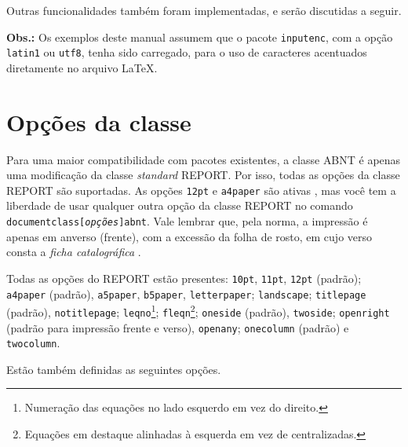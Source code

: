 \documentclass[espaco=simples,appendix=Name]{abnt}
\newcommand{\abnt}{{\smaller ABNT}}%
\newcommand{\report}{{\smaller REPORT}}%
\newcommand{\ac}{\symbol{123}}  %
\newcommand{\fc}{\symbol{125}}  %
\newcommand{\bs}{\symbol{92}}   %
\newcommand{\ingles}[1]{\textsl{#1}}
\begin{document}
Outras funcionalidades também foram implementadas, e serão discutidas a
seguir. 

\textbf{Obs.:} Os exemplos deste manual
assumem que o pacote \texttt{inputenc}, com a opção \texttt{latin1} ou \texttt{utf8}, tenha
sido carregado, para o uso de caracteres acentuados diretamente no arquivo \LaTeX.

\chapter{Opções da classe}\label{sec: opcoes de classe}

Para uma maior compatibilidade com pacotes existentes, a classe \abnt{} é
apenas uma modificação da classe \ingles{standard} \report. Por isso, todas
as opções da classe \report{} são suportadas. As opções \texttt{12pt} e
\texttt{a4paper} são ativas \cite[5.1]{NBR14724:2001}, mas você tem a
liberdade de usar qualquer outra opção da classe \report{} no comando
\texttt{\bs documentclass[\textit{opções}]\ac abnt\fc}. Vale lembrar que,
pela norma, a impressão é apenas em anverso (frente), com a excessão da
folha de rosto, em cujo verso consta a \emph{ficha catalográfica}
\cite[5.4]{NBR14724:2001}. 

Todas as opções do \report{} estão presentes:
\texttt{10pt},
\texttt{11pt},  
\texttt{12pt} (padrão);
\texttt{a4paper} (padrão), 
\texttt{a5paper}, 
\texttt{b5paper},
\texttt{letterpaper};
\texttt{landscape};
\texttt{titlepage} (padrão),
\linebreak
\texttt{notitlepage};
\texttt{leqno}\footnote{Numeração das equações no lado esquerdo em vez do
  direito.}; 
\texttt{fleqn}\footnote{Equações em destaque alinhadas à esquerda em vez de
  centralizadas.}; 
\texttt{oneside} (padrão),
\texttt{twoside};
\texttt{openright} (padrão
para impressão frente e verso), 
\texttt{openany};
\texttt{onecolumn} (padrão) e
\texttt{twocolumn}. 

Estão também definidas as seguintes opções.
\end{document}
